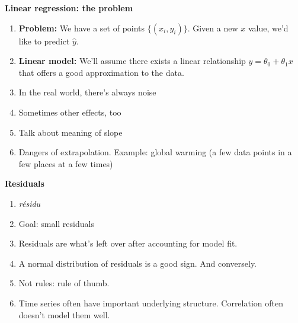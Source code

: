 




\textbf{Linear regression: the problem}
\begin{enumerate}
\item \textbf{Problem:} We have a set of points $\{(x_i, y_i)\}$.
  Given a new $x$ value, we'd like to predict $\hat y$.
\item \textbf{Linear model:} We'll assume there exists a linear
  relationship $y=\theta_0 + \theta_1 x$ that offers a good
  approximation to the data.
\item In the real world, there's always noise
\item Sometimes other effects, too
\item Talk about meaning of slope
\item Dangers of extrapolation.  Example: global warming (a few data
  points in a few places at a few times)
\end{enumerate}

\textbf{Residuals}
\begin{enumerate}
\item \textit{résidu}
\item Goal: small residuals
\item Residuals are what's left over after accounting for model fit.
\item A normal distribution of residuals is a good sign.  And
  conversely.
\item Not rules: rule of thumb.
\item Time series often have important underlying structure.
  Correlation often doesn't model them well.
\end{enumerate}

